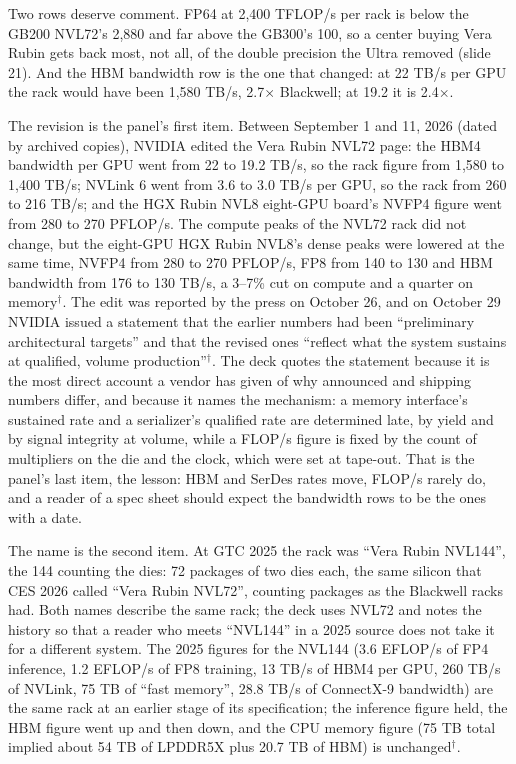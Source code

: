 \documentclass[11pt,letterpaper]{article}
\begin{document}
Two rows deserve comment. FP64 at 2{,}400 TFLOP/s per rack is below the GB200 NVL72's 2{,}880 and far above the GB300's 100, so a center buying Vera Rubin gets back most, not all, of the double precision the Ultra removed (slide 21). And the HBM bandwidth row is the one that changed: at 22 TB/s per GPU the rack would have been 1{,}580 TB/s, 2.7$\times$ Blackwell; at 19.2 it is 2.4$\times$.

The revision is the panel's first item. Between September 1 and 11, 2026 (dated by archived copies), NVIDIA edited the Vera Rubin NVL72 page: the HBM4 bandwidth per GPU went from 22 to 19.2 TB/s, so the rack figure from 1{,}580 to 1{,}400 TB/s; NVLink 6 went from 3.6 to 3.0 TB/s per GPU, so the rack from 260 to 216 TB/s; and the HGX Rubin NVL8 eight-GPU board's NVFP4 figure went from 280 to 270 PFLOP/s. The compute peaks of the NVL72 rack did not change, but the eight-GPU HGX Rubin NVL8's dense peaks were lowered at the same time, NVFP4 from 280 to 270 PFLOP/s, FP8 from 140 to 130 and HBM bandwidth from 176 to 130 TB/s, a 3--7\% cut on compute and a quarter on memory$^\dagger$. The edit was reported by the press on October 26, and on October 29 NVIDIA issued a statement that the earlier numbers had been ``preliminary architectural targets'' and that the revised ones ``reflect what the system sustains at qualified, volume production''$^\dagger$. The deck quotes the statement because it is the most direct account a vendor has given of why announced and shipping numbers differ, and because it names the mechanism: a memory interface's sustained rate and a serializer's qualified rate are determined late, by yield and by signal integrity at volume, while a FLOP/s figure is fixed by the count of multipliers on the die and the clock, which were set at tape-out. That is the panel's last item, the lesson: HBM and SerDes rates move, FLOP/s rarely do, and a reader of a spec sheet should expect the bandwidth rows to be the ones with a date.

The name is the second item. At GTC 2025 the rack was ``Vera Rubin NVL144'', the 144 counting the dies: 72 packages of two dies each, the same silicon that CES 2026 called ``Vera Rubin NVL72'', counting packages as the Blackwell racks had. Both names describe the same rack; the deck uses NVL72 and notes the history so that a reader who meets ``NVL144'' in a 2025 source does not take it for a different system. The 2025 figures for the NVL144 (3.6 EFLOP/s of FP4 inference, 1.2 EFLOP/s of FP8 training, 13 TB/s of HBM4 per GPU, 260 TB/s of NVLink, 75 TB of ``fast memory'', 28.8 TB/s of ConnectX-9 bandwidth) are the same rack at an earlier stage of its specification; the inference figure held, the HBM figure went up and then down, and the CPU memory figure (75 TB total implied about 54 TB of LPDDR5X plus 20.7 TB of HBM) is unchanged$^\dagger$.
\end{document}
